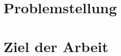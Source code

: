 \section{Problemstellung}
\label{sec:problemstellung}


\section{Ziel der Arbeit}
\label{sec:zielDerArbeit}